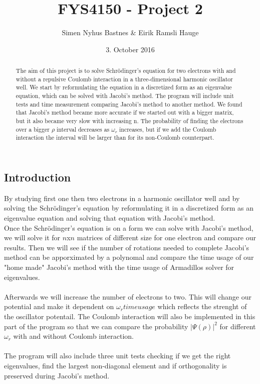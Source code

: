 \documentclass{article}
\title{FYS4150 - Project 2}
\author{Simen Nyhus Bastnes \& Eirik Ramsli Hauge}
\date{3. October 2016}
\begin{document}
\maketitle
\begin{abstract}
The aim of this project is to solve Schrödinger's equation for two electrons with and without a repulsive Coulomb interaction in a three-dimensional harmonic oscillator well. We start by reformulating the equation in a discretized form as an eigenvalue equation, which can be solved with Jacobi's method. The program will include unit tests and time measurement comparing Jacobi's method to another method. We found that Jacobi's method became more accurate if we started out with a bigger matrix, but it also became very slow with increasing n. The probability of finding the electrons over a bigger $\rho$ interval decreases as $\omega_r$ increases, but if we add the Coulomb interaction the interval will be larger than for its non-Coulomb counterpart.
\end{abstract}
\subsection{Introduction}
By studying first one then two electrons in a harmonic oscillator well and by solving the Schrödinger's equation by reformulating it in a discretized form as an eigenvalue equation and solving that equation with Jacobi's method. \\
Once the Schrödinger's equation is on a form we can solve with Jacobi's method, we will solve it for $n$x$n$ matrices of different size for one electron and compare our results. Then we will see if the number of rotations needed to complete Jacobi's method can be apporximated by a polynomal and compare the time usage of our "home made" Jacobi's method with the time usage of Armadillos solver for eigenvalues. \\ \\
Afterwards we will increase the number of electrons to two. This will change our potential and make it dependent on $\omega_rtime usage$ which reflects the strenght of the oscillator potentail. The Coulomb interaction will also be implemented in this part of the program so that we can compare the probability $|\Psi(\rho)|^2$ for different $\omega_r$ with and without Coulomb interaction. \\ \\
The program will also include three unit tests checking if we get the right eigenvalues, find the largest non-diagonal element and if orthogonality is preserved during Jacobi's method. 
\end{document}
